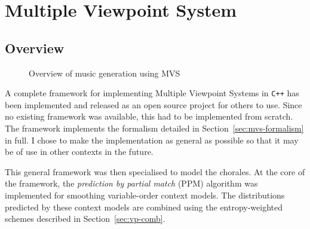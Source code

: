 \documentclass[12pt,a4paper,twoside,openright]{report}
\newcommand{\sref}[1]{Section~\ref{#1}}
\begin{document}
\section{Multiple Viewpoint System}

\subsection{Overview}

\begin{figure}[H]
\centering
{}
\caption{Overview of music generation using MVS}
\label{fig:mvs-gen-overview}
\end{figure}

A complete framework for implementing Multiple Viewpoint Systems in \verb!C++!
has been implemented and released as an open source project for others to use.
Since no existing framework was available, this had to be implemented from
scratch. The framework implements the formalism detailed in
\sref{sec:mvs-formalism} in full. I chose to make the implementation as
general as possible so that it may be of use in other contexts in the future. 

This general framework was then specialised to model the chorales. At the core
of the framework, the \emph{prediction by partial match} (PPM) algorithm was
implemented for smoothing variable-order context models. The distributions
predicted by these context models are combined using the entropy-weighted
schemes described in \sref{sec:vp-comb}.
\end{document}
